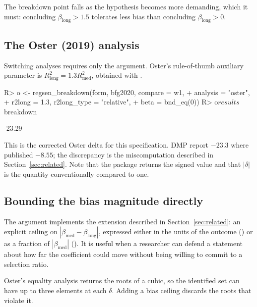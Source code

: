 \documentclass[article]{jss}\usepackage[]{graphicx}\usepackage[]{xcolor}
\newcommand{\blong}{\beta_{\mathrm{long}}}
\newcommand{\bmed}{\beta_{\mathrm{med}}}
\begin{document}
The breakdown point falls as the hypothesis becomes more demanding, which
it must: concluding $\blong > 1.5$ tolerates less bias than concluding
$\blong > 0$.

\subsection{The Oster (2019) analysis}\label{sec:api-oster}

Switching analyses requires only the  argument. Oster's
rule-of-thumb auxiliary parameter is
$R^2_{\mathrm{long}} = 1.3 R^2_{\mathrm{med}}$, obtained with
.

\begin{Schunk}
\begin{Sinput}
R> o <- regsen_breakdown(form, bfg2020, compare = w1,
+                        analysis = "oster",
+                        r2long = 1.3, r2long_type = "relative",
+                        beta = bnd_eq(0))
R> o$results$breakdown
\end{Sinput}
\begin{Soutput}
[1] -23.29
\end{Soutput}
\end{Schunk}

This is the corrected Oster delta for this specification. DMP report
$-23.3$ where \citet{BFG2020} published $-8.55$; the discrepancy is the
miscomputation described in Section~\ref{sec:related}. Note that the
package returns the signed value and that $|\delta|$ is the quantity
conventionally compared to one.

\subsection{Bounding the bias magnitude directly}\label{sec:api-maxovb}

The  argument implements the \citet{Masten2026} extension
described in Section~\ref{sec:related}: an explicit ceiling on
$|\bmed - \blong|$, expressed either in the units of the outcome
() or as a fraction of $|\bmed|$
(). It is useful when a researcher can
defend a statement about how far the coefficient could move without
being willing to commit to a selection ratio.

Oster's equality analysis returns the roots of a cubic, so the identified
set can have up to three elements at each $\delta$. Adding a bias ceiling
discards the roots that violate it.
\end{document}
